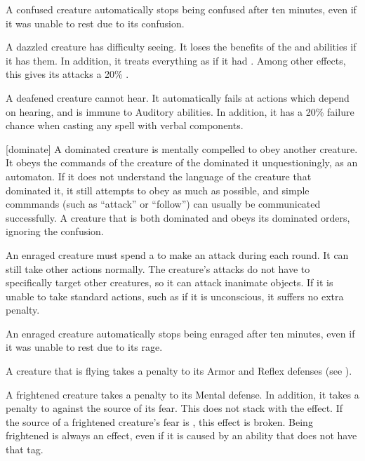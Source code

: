  A confused creature automatically stops being confused after ten minutes, even if it was unable to rest due to its confusion.

   A dazzled creature has difficulty seeing.
  It loses the benefits of the  and  abilities if it has them.
  In addition, it treats everything as if it had .
  Among other effects, this gives its  attacks a 20\% .

   A deafened creature cannot hear.
  It automatically fails at actions which depend on hearing, and is immune to Auditory abilities.
  In addition, it has a 20\% failure chance when casting any spell with verbal components.

  [dominate] A dominated creature is mentally compelled to obey another creature.
  It obeys the commands of the creature of the dominated it unquestioningly, as an automaton.
  If it does not understand the language of the creature that dominated it, it still attempts to obey as much as possible, and simple commmands (such as ``attack'' or ``follow'') can usually be communicated successfully.
  A creature that is both dominated and \confused obeys its dominated orders, ignoring the confusion.

   An enraged creature must spend a  to make an attack during each round.
  It can still take other actions normally.
  The creature's attacks do not have to specifically target other creatures, so it can attack inanimate objects.
  If it is unable to take standard actions, such as if it is unconscious, it suffers no extra penalty.

  An enraged creature automatically stops being enraged after ten minutes, even if it was unable to rest due to its rage.

   A creature that is flying takes a  penalty to its Armor and Reflex defenses (see ).

   A frightened creature takes a  penalty to its Mental defense.
  In addition, it takes a  penalty to  against the source of its fear.
  This does not stack with the \panicked effect.
  If the source of a frightened creature's fear is , this effect is broken.
  Being frightened is always an  effect, even if it is caused by an ability that does not have that tag.

